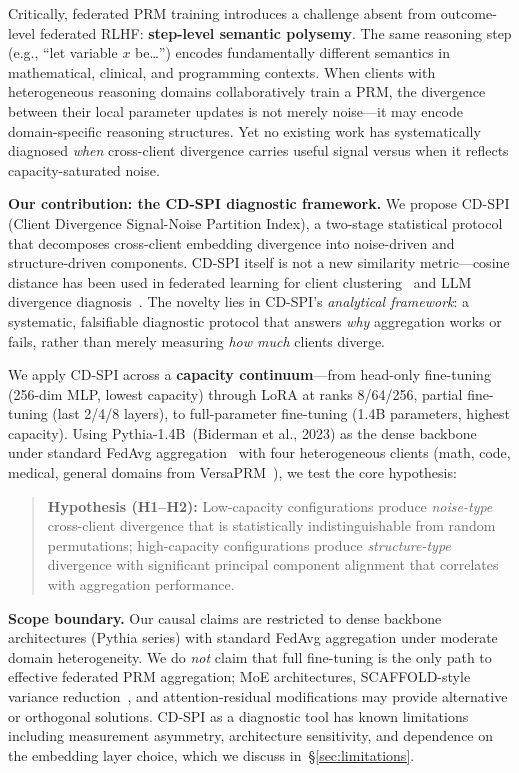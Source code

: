 \documentclass{article}
\begin{document}
Critically, federated PRM training introduces a challenge absent from outcome-level federated RLHF: \textbf{step-level semantic polysemy}.
The same reasoning step (e.g., ``let variable $x$ be\dots'') encodes fundamentally different semantics in mathematical, clinical, and programming contexts.
When clients with heterogeneous reasoning domains collaboratively train a PRM, the divergence between their local parameter updates is not merely noise---it may encode domain-specific reasoning structures.
Yet no existing work has systematically diagnosed \emph{when} cross-client divergence carries useful signal versus when it reflects capacity-saturated noise.

\textbf{Our contribution: the CD-SPI diagnostic framework.}
We propose CD-SPI (Client Divergence Signal-Noise Partition Index), a two-stage statistical protocol that decomposes cross-client embedding divergence into noise-driven and structure-driven components.
CD-SPI itself is not a new similarity metric---cosine distance has been used in federated learning for client clustering~\cite{cfl2020} and LLM divergence diagnosis~\cite{fedcdd2025}.
The novelty lies in CD-SPI's \emph{analytical framework}: a systematic, falsifiable diagnostic protocol that answers \emph{why} aggregation works or fails, rather than merely measuring \emph{how much} clients diverge.

We apply CD-SPI across a \textbf{capacity continuum}---from head-only fine-tuning (256-dim MLP, lowest capacity) through LoRA at ranks 8/64/256, partial fine-tuning (last 2/4/8 layers), to full-parameter fine-tuning (1.4B parameters, highest capacity).
Using Pythia-1.4B~(Biderman et al., 2023) as the dense backbone under standard FedAvg aggregation~\cite{fedavg2017} with four heterogeneous clients (math, code, medical, general domains from VersaPRM~\cite{versaprm2025}), we test the core hypothesis:

\begin{quote}
\textbf{Hypothesis (H1--H2):} Low-capacity configurations produce \emph{noise-type} cross-client divergence that is statistically indistinguishable from random permutations; high-capacity configurations produce \emph{structure-type} divergence with significant principal component alignment that correlates with aggregation performance.
\end{quote}

\textbf{Scope boundary.}
Our causal claims are restricted to dense backbone architectures (Pythia series) with standard FedAvg aggregation under moderate domain heterogeneity.
We do \emph{not} claim that full fine-tuning is the only path to effective federated PRM aggregation; MoE architectures, SCAFFOLD-style variance reduction~\cite{scaffold2020}, and attention-residual modifications may provide alternative or orthogonal solutions.
CD-SPI as a diagnostic tool has known limitations including measurement asymmetry, architecture sensitivity, and dependence on the embedding layer choice, which we discuss in~\S\ref{sec:limitations}.
\end{document}
